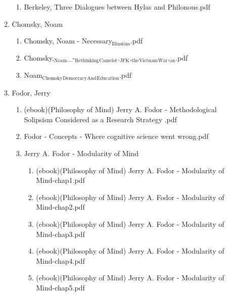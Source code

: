 \documentclass[11pt]{article}
\begin{document}
\begin{enumerate}
\begin{enumerate}
\begin{enumerate}
\item Berkeley, Three Dialogues between Hylas and Philonous.pdf
\label{sec-1-1-1-1-34-25-30-2}
\end{enumerate}

\item Chomsky, Noam
\label{sec-1-1-1-1-34-25-31}
\begin{enumerate}
\item Chomsky, Noam - Necessary$_{\text{Illusions}}$.pdf
\label{sec-1-1-1-1-34-25-31-1}

\item Chomsky,$_{\text{Noam}}$\_-$_{\text{Rethinking}}$$_{\text{Camelot}}$.$_{\text{JFK}}$,$_{\text{the}}$$_{\text{Vietnam}}$$_{\text{War}}$,$_{\text{an}}$.pdf
\label{sec-1-1-1-1-34-25-31-2}

\item Noam$_{\text{Chomsky}}$$_{\text{Democracy}}$$_{\text{And}}$$_{\text{Education}}$.pdf
\label{sec-1-1-1-1-34-25-31-3}
\end{enumerate}

\item Fodor, Jerry
\label{sec-1-1-1-1-34-25-32}
\begin{enumerate}
\item (ebook)(Philosophy of Mind) Jerry A. Fodor - Methodological Solipsism Considered as a Research Strategy .pdf
\label{sec-1-1-1-1-34-25-32-1}

\item Fodor - Concepts - Where cognitive science went wrong.pdf
\label{sec-1-1-1-1-34-25-32-2}

\item Jerry A. Fodor - Modularity of Mind
\label{sec-1-1-1-1-34-25-32-3}
\begin{enumerate}
\item (ebook)(Philosophy of Mind) Jerry A. Fodor - Modularity of Mind-chap1.pdf
\label{sec-1-1-1-1-34-25-32-3-1}

\item (ebook)(Philosophy of Mind) Jerry A. Fodor - Modularity of Mind-chap2.pdf
\label{sec-1-1-1-1-34-25-32-3-2}

\item (ebook)(Philosophy of Mind) Jerry A. Fodor - Modularity of Mind-chap3.pdf
\label{sec-1-1-1-1-34-25-32-3-3}

\item (ebook)(Philosophy of Mind) Jerry A. Fodor - Modularity of Mind-chap4.pdf
\label{sec-1-1-1-1-34-25-32-3-4}

\item (ebook)(Philosophy of Mind) Jerry A. Fodor - Modularity of Mind-chap5.pdf
\label{sec-1-1-1-1-34-25-32-3-5}


\end{enumerate}
\end{enumerate}
\end{enumerate}
\end{enumerate}
\end{document}
